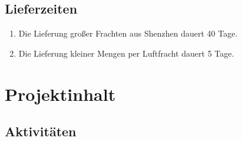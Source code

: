 \subsection{Lieferzeiten}
\begin{enumerate}
    \item Die Lieferung großer Frachten aus Shenzhen dauert 40 Tage.
    \item Die Lieferung kleiner Mengen per Luftfracht dauert 5 Tage.
\end{enumerate}

\section{Projektinhalt}
\subsection{Aktivitäten}
